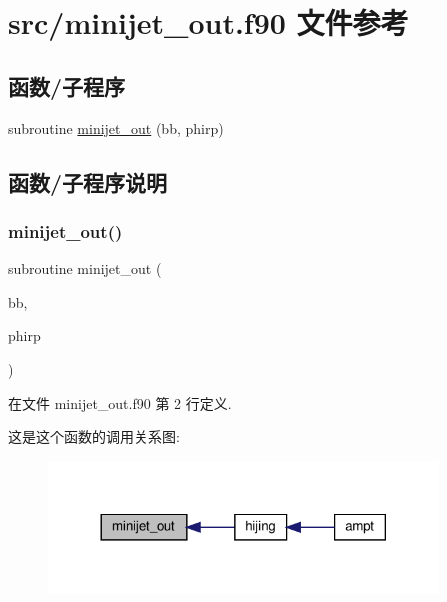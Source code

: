\hypertarget{minijet__out_8f90}{}\section{src/minijet\+\_\+out.f90 文件参考}
\label{minijet__out_8f90}
\subsection*{函数/子程序}
\begin{DoxyCompactItemize}
\item 
subroutine \mbox{\hyperlink{minijet__out_8f90_a04e1d741addfa3bc84f66a10a760b14f}{minijet\+\_\+out}} (bb, phirp)
\end{DoxyCompactItemize}


\subsection{函数/子程序说明}
\mbox{\label{minijet__out_8f90_a04e1d741addfa3bc84f66a10a760b14f}} 
\subsubsection{\texorpdfstring{minijet\+\_\+out()}{minijet\_out()}}
{\footnotesize\ttfamily subroutine minijet\+\_\+out (\begin{DoxyParamCaption}\item[{}]{bb,  }\item[{}]{phirp }\end{DoxyParamCaption})}



在文件 minijet\+\_\+out.\+f90 第 2 行定义.

这是这个函数的调用关系图\+:
\nopagebreak
\begin{figure}[H]
\begin{center}
\leavevmode
\includegraphics[width=293pt]{minijet__out_8f90_a04e1d741addfa3bc84f66a10a760b14f_icgraph}
\end{center}
\end{figure}

